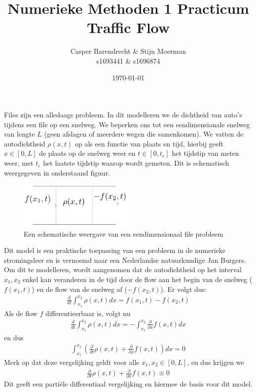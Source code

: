 \documentclass{article}
\title{Numerieke Methoden 1 Practicum Traffic Flow}
\author{Casper Barendrecht \& Stijn Moerman\\ s1693441 \& s1696874}
\date{\today}
\begin{document}
\maketitle

Files zijn een alledaags probleem. In dit modelleren we de dichtheid van auto's tijdens een file op een snelweg. We beperken ons tot een eendimensionale snelweg van lengte \(L\) (geen afslagen of meerdere wegen die samenkomen). 
We vatten de autodichtheid \(\rho(x,t)\) op als een functie van plaats en tijd, hierbij geeft \(x\in[0,L]\) de plaats op de snelweg weer en \(t\in[0,t_e]\) het tijdstip van meten weer, met \(t_e\) het laatste tijdstip waarop wordt gemeten. 
Dit is schematisch weergegeven in onderstaand figuur.

\begin{figure}[H]
  \centering
  \includegraphics[width=0.5\textwidth]{flow}
  \caption{Een schematische weergave van een eendimensionaal file probleem}
  \label{fig:file}
\end{figure}

Dit model is een praktische toepassing van een probleem in de numerieke stromingsleer en is vernoemd naar een Nederlandse natuurkundige Jan Burgers.
Om dit te modelleren, wordt aangenomen dat de autodichtheid op het interval \(x_1,x_2\) enkel kan veranderen in de tijd door de flow aan het begin van de snelweg (\(f(x_1,t)\)) en de flow van de snelweg af  (\(-f(x_2,t)\)). 
Er volgt dus:
\begin{align*}
\frac{d}{dt}\int_{x_1}^{x_2}\rho(x,t)dx=f(x_1,t)-f(x_2,t)
\end{align*}
Als de flow \(f\) differentieerbaar is, volgt nu
\begin{align*}
	\frac{d}{dt}\int_{x_1}^{x_2}\rho(x,t)dx = -\int_{x_1}^{x_2}\frac{\partial}{\partial x}f(x,t)dx
\end{align*}
en dus
\begin{align}
	\int_{x_1}^{x_2}\left(\frac{\partial}{\partial t}\rho(x,t)+\frac{\partial}{\partial x}f(x,t)\right)dx=0
\end{align}
Merk op dat deze vergelijking geldt voor alle \(x_1,x_2\in[0,L]\), en dus krijgen we 
\begin{align*}
	\frac{\partial}{\partial t}\rho(x,t)+\frac{\partial}{\partial x}f(x,t) \equiv 0
\end{align*}
Dit geeft een parti\"ele differentiaal vergelijking en hiermee de basis voor dit model.
\end{document}
